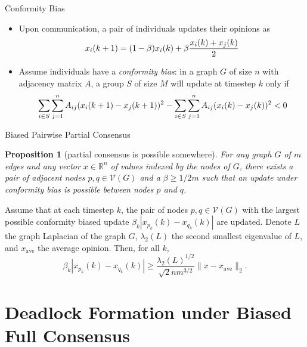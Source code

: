 \documentclass[usenames,dvipsnames,10pt]{beamer}
\newtheorem{proposition}{Proposition}
\theoremstyle{remark}
\newcommand{\R}[0]{\mathbb{R}}
\begin{document}
\begin{frame}{Conformity Bias}
\begin{itemize}
    \item Upon communication, a pair of individuals updates their opinions as
    \begin{equation}{\label{eq:updateRule}}
        x_i(k+1) = (1-\beta)x_i(k) + \beta\frac{x_i(k)+x_j(k)}{2}
    \end{equation}
    \pause
    \item Assume individuals have a \textit{conformity bias}: in a graph $G$ of size $n$ with adjacency matrix $A$, a group $S$ of size $M$ will update at timestep $k$ only if
    \begin{equation}{\label{eq:biasRule}}
        \sum_{i\in S}\sum_{j=1}^nA_{ij}(x_i(k+1)-x_j(k+1))^2-\sum_{i\in S}\sum_{j=1}^nA_{ij}(x_i(k)-x_j(k))^2 < 0
    \end{equation}
\end{itemize}
\end{frame}

\begin{frame}{Biased Pairwise Partial Consensus}
    \begin{proposition}[partial consensus is possible somewhere] {\label{prop:updatePairExistence}}
	For any graph $G$ of $m$ edges and any vector $x\in\R^n$ of values indexed by the nodes of $G$, there exists a pair of adjacent nodes $p,q\in\mathcal{V}(G)$ and a $\beta\geq1/2m$ such that an update under conformity bias is possible between nodes $p$ and $q$.
\end{proposition}
\pause
\begin{theorem}{\label{theorem:betaConvergence}}
	Assume that at each timestep $k$, the pair of nodes $p,q\in\mathcal{V}(G)$ with the largest possible conformity biased update $\beta_k|x_{p_k}(k)-x_{q_k}(k)|$ are updated. Denote $L$ the graph Laplacian of the graph $G$, $\lambda_2(L)$ the second smallest eigenvalue of $L$, and $x_\text{ave}$ the average opinion. Then, for all $k$, 
	$$
	\beta_k|x_{p_k}(k)-x_{q_k}(k)|\geq\frac{\lambda_2(L)^{1/2}}{\sqrt{2}nm^{3/2}}\|x-x_{\text{ave}}\|_2.
	$$
\end{theorem}
\end{frame}

\section{Deadlock Formation under Biased Full Consensus}
\end{document}
